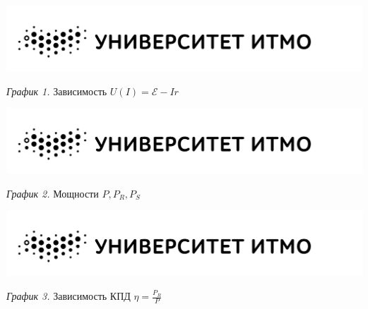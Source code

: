 \hypertarget{diagram1}{}

\begin{center}
    \includegraphics[width=15cm]{images/logo}

    \smallvspace

    \textit{График 1.} Зависимость $U(I) = \mathscr{E} - Ir$
\end{center}

\begin{center}
    \includegraphics[width=15cm]{images/logo}

    \smallvspace

    \textit{График 2.} Мощности $P, P_R, P_S$
\end{center}

\begin{center}
    \includegraphics[width=15cm]{images/logo}

    \smallvspace

    \textit{График 3.} Зависимость КПД $\eta = \frac{P_R}{P}$
\end{center}
